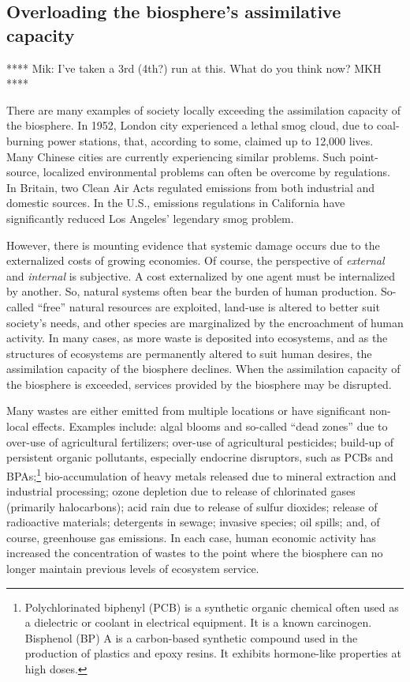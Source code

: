 \subsection{Overloading the biosphere's assimilative capacity}

**** Mik: I've taken a 3rd (4th?) run at this. 
What do you think now? MKH ****

There are many examples of society locally exceeding 
the assimilation capacity of the biosphere.
In 1952, London city experienced a lethal smog cloud,
due to coal-burning power stations,
that, according to some, 
claimed up to 12,000 lives.\cite{Davis2002,Bell2004}
Many Chinese cities are currently experiencing similar problems.
Such point-source, localized environmental problems can often be overcome
by regulations.
In Britain, two Clean Air Acts regulated emissions from both
industrial and domestic sources.\cite{Brimblecombe2006}	
In the U.S., emissions regulations in California have 
significantly reduced Los Angeles' legendary smog problem.

However, there is mounting evidence that systemic
damage occurs due to the externalized costs
of growing economies.
Of course, the perspective of \emph{external} and \emph{internal} is subjective.
A cost externalized by one agent
must be internalized by another.\cite{MEA2005,Ewing2008}
So, natural systems often bear the burden of human production.
So-called ``free'' natural resources are exploited,
land-use is altered to better suit society's needs,
and other species are marginalized by the encroachment of human activity.\cite{schnaiberg1980}
In many cases, as more waste is deposited into ecosystems,
and as the structures of ecosystems are permanently altered to suit human desires,
the assimilation capacity of the biosphere declines.
When the assimilation capacity of the biosphere is exceeded, 
services provided by the biosphere may be disrupted.\cite{UNMEA2005}

Many wastes are either emitted from multiple locations or have 
significant non-local effects. 
Examples include:
algal blooms and so-called ``dead zones'' due to over-use of agricultural fertilizers;
over-use of agricultural pesticides;
build-up of persistent organic pollutants, especially endocrine disruptors, such as PCBs 
	and BPAs;\footnote{Polychlorinated biphenyl (PCB) 
		is a synthetic organic chemical often used as 
		a dielectric or coolant in electrical equipment.
		It is a known carcinogen.
		Bisphenol (BP) A is a carbon-based synthetic compound used in the production
		of plastics and epoxy resins. It exhibits hormone-like properties at high doses.
		}
bio-accumulation of heavy metals released due to mineral extraction and industrial processing;
ozone depletion due to release of chlorinated gases (primarily halocarbons);
acid rain due to release of sulfur dioxides;
release of radioactive materials;
detergents in sewage;
invasive species;
oil spills;
and, of course, greenhouse gas emissions.\cite{UNMEA2005, Butler1978, Walker2012}
In each case, human economic activity has increased the concentration
of wastes to the point where the biosphere can no longer maintain 
previous levels of ecosystem service.

